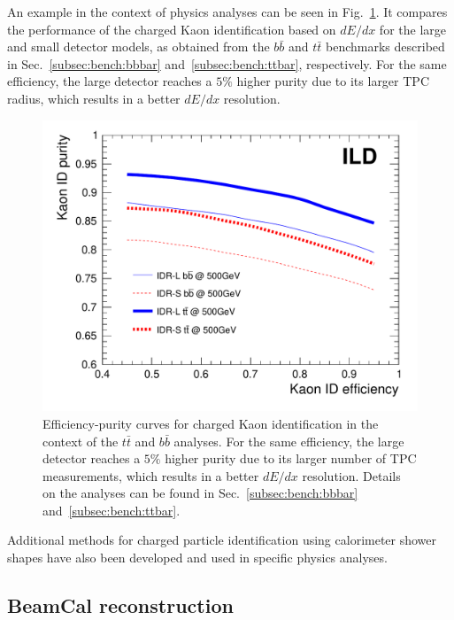 An example in the context of physics analyses can be seen in Fig.~\ref{fig:perf:KaonID}. It compares the performance of the charged Kaon identification based on $dE/dx$ for the large and small detector models, as obtained from the $b\bar{b}$ and $t\bar{t}$ benchmarks described in Sec.~\ref{subsec:bench:bbbar} and~\ref{subsec:bench:ttbar}, respectively. For the same efficiency, the large detector reaches a $5\%$ higher purity due to its larger TPC radius, which results in a better $dE/dx$ resolution.

\begin{figure}[b!]
  \includegraphics[width=0.6\hsize]{Performance/fig/kaonIDeff_v2-eps-converted-to.pdf}
  \caption{\label{fig:perf:KaonID}
    Efficiency-purity curves for charged Kaon identification in the context of the $t\bar{t}$ and $b\bar{b}$ analyses. For the same
    efficiency, the large detector reaches a $5\%$ higher purity due to its larger number of TPC measurements, which results in a better $dE/dx$
    resolution. Details on the analyses can be found in Sec.~\ref{subsec:bench:bbbar} and~\ref{subsec:bench:ttbar}.
  }
\end{figure}
Additional methods for charged particle identification using calorimeter shower shapes have also been developed and used in specific physics analyses.


\subsection{BeamCal reconstruction}

